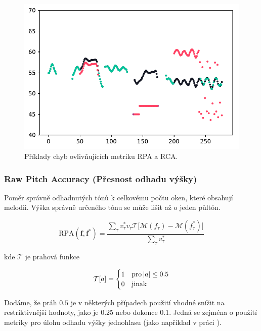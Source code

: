 \begin{figure}[h!]\centering
\includegraphics[scale=0.5]{../img/chyba_RPA}
\caption{Příklady chyb ovlivňujících metriku RPA a RCA.}
\label{obr:chyba_RPA}
\end{figure}


\subsubsection{Raw Pitch Accuracy (Přesnost odhadu výšky)}

Poměr správně odhadnutých tónů k celkovému počtu oken, které obsahují melodii. Výška správně určeného tónu se může lišit až o jeden půltón.


    $$\mathrm{RPA}(\mathbf{f}, \mathbf{f^*}) = \frac{\sum_\tau{v^*_\tau v_\tau \mathcal{T}[\mathcal{M}(f_\tau) - \mathcal{M}(f^*_\tau)}] }{\sum_\tau{v^*_\tau}}$$

kde $\mathcal{T}$ je prahová funkce

    \begin{equation*}
        \mathcal{T}[a] = \begin{cases}
                1 & \mathrm{pro} \left|{a}\right| \le 0.5 \\
                0 & \text{jinak}
                
            \end{cases}
    \end{equation*}

Dodáme, že práh $0.5$ je v některých případech použití vhodné snížit na restriktivnější hodnoty, jako je $0.25$ nebo dokonce $0.1$. Jedná se zejména o použití metriky pro úlohu odhadu výšky jednohlasu (jako například v práci \cite{Kim2018}).

